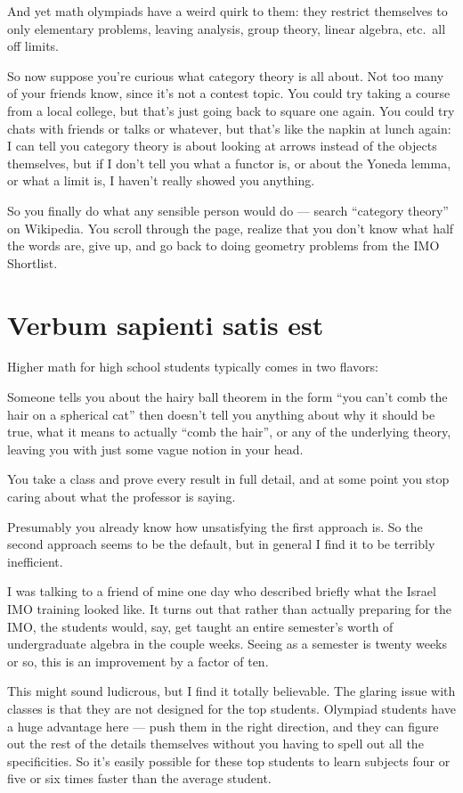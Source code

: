 And yet math olympiads have a weird quirk to them:
they restrict themselves to only elementary problems,
leaving analysis, group theory, linear algebra, etc.\ all off limits.

So now suppose you're curious what category theory is all about.
Not too many of your friends know, since it's not a contest topic.
You could try taking a course from a local college, but that's just going back to square one again.
You could try chats with friends or talks or whatever, but that's like the napkin at lunch again:
I can tell you category theory is about looking at arrows instead of the objects themselves,
but if I don't tell you what a functor is, or about the Yoneda lemma,
or what a limit is, I haven't really showed you anything.

So you finally do what any sensible person would do --- search ``category theory'' on Wikipedia.
You scroll through the page, realize that you don't know what half the words are,
give up, and go back to doing geometry problems from the IMO Shortlist.

\section*{Verbum sapienti satis est}
Higher math for high school students typically comes in two flavors:
\begin{itemize}
	\ii Someone tells you about the hairy ball theorem in the form
	``you can't comb the hair on a spherical cat''
	then doesn't tell you anything about why it should be true,
	what it means to actually ``comb the hair'', 
	or any of the underlying theory,
	leaving you with just some vague notion in your head.

	\ii You take a class and prove every result in full detail,
	and at some point
	you stop caring about what the professor is saying.
\end{itemize}
Presumably you already know how unsatisfying the first approach is.
So the second approach seems to be the default,
but in general I find it to be terribly inefficient.

I was talking to a friend of mine one day who described briefly
what the Israel IMO training looked like.
It turns out that rather than actually preparing for the IMO,
the students would, say, get taught an entire semester's worth of
undergraduate algebra in the couple weeks.
Seeing as a semester is twenty weeks or so, this is an improvement
by a factor of ten.

This might sound ludicrous, but I find it totally believable.
The glaring issue with classes is that they are not designed for the top students.
Olympiad students have a huge advantage here --- push them in the right direction,
and they can figure out the rest of the details themselves
without you having to spell out all the specificities.
So it's easily possible for these top students to learn subjects
four or five or six times faster than the average student.


